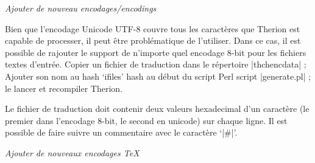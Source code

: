 {\it Ajouter de nouveau encodages/encodings}

Bien que l'encodage Unicode UTF-8 couvre tous les caract\`eres que Therion est capable de processer,
il peut \^etre probl\'ematique de l'utiliser.
Dans ce cas, il est possible de rajouter le support de n'importe quel encodage 8-bit pour les fichiers textes d'entr\'ee.
Copier un fichier de traduction dans le r\'epertoire |thchencdata| ; 
Ajouter son nom au hash `ifiles' hash au d\'ebut du script Perl script |generate.pl| ; 
le lancer et recompiler Therion.

Le fichier de traduction doit contenir deux valeurs hexadecimal d'un caract\`ere
(le premier dans l'encodage 8-bit, le second en unicode) sur chaque ligne. 
Il est possible de faire suivre un commentaire avec le caract\`ere `|#|'. 

{\it Ajouter de nouveaux encodages \TeX}

